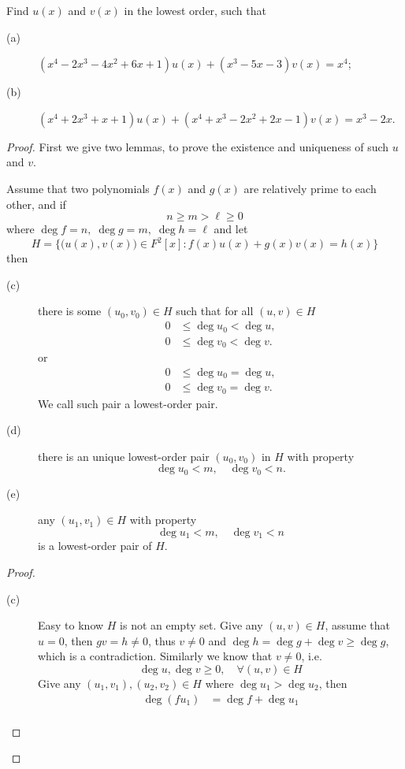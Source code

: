 \begin{pro}%
	Find $u(x)$ and $v(x)$ in the lowest order, such that
	\begin{description}
	\item[(a)] $(x^4-2x^3-4x^2+6x+1)u(x)+(x^3-5x-3)v(x)=x^4$;
	\item[(b)] $(x^4+2x^3+x+1)u(x)+(x^4+x^3-2x^2+2x-1)v(x)=x^3-2x$.
	\end{description}
\end{pro}
\begin{proof}
	First we give two lemmas, to prove the existence and uniqueness of such $u$ and $v$.
	\begin{lem}
		Assume that two polynomials $f(x)$ and $g(x)$ are relatively prime to each other, and if 
		\[n\geq m>\ell\geq 0\]
		where $\deg f=n,\;\deg g=m,\;\deg h=\ell$ and let
		\[H=\{\big(u(x),v(x)\big)\in F^2[x]\colon f(x)u(x)+g(x)v(x)=h(x)\}\]
		then 
		\begin{description}
			\item[(c)] there is some $(u_0,v_0)\in H$ such that for all $(u,v)\in H$
			\begin{align*}
			0&\leq \deg u_0< \deg u,\\
			0&\leq \deg v_0< \deg v.
			\end{align*}
			or 
			\begin{align*}
			0&\leq \deg u_0= \deg u,\\
			0&\leq \deg v_0= \deg v.
			\end{align*}
			We call such pair a lowest-order pair.
			\item[(d)] there is an unique lowest-order pair $(u_0,v_0)$ in $H$ with property
			\[\deg u_0<m,\quad \deg v_0<n.\]
			\item[(e)] any $(u_1,v_1)\in H$ with property
			\[\deg u_1<m,\quad \deg v_1<n\]
			is a lowest-order pair of $H$.
		\end{description}
	\end{lem}
	\begin{proof}
		\begin{description}
			\item[(c)] Easy to know $H$ is not an empty set. Give any $(u,v)\in H$, assume that $u=0$, then $gv=h\neq 0$, thus $v\neq 0$ and $\deg h=\deg g+\deg v\geq \deg g$, which is a contradiction. Similarly we know that $v\neq 0$, i.e.
			\[\deg u,\deg v\geq 0,\quad \forall (u,v)\in H\]
			Give any $(u_1,v_1),(u_2,v_2)\in H$ where $\deg u_1>\deg u_2$, then
			\begin{align*}
			\deg (fu_1)&=\deg f+\deg u_1\\

\end{align*}
\end{description}
\end{proof}
\end{proof}
